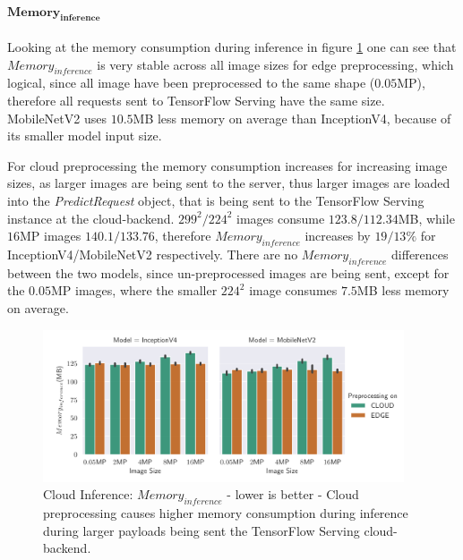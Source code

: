 \paragraph{$\mathbf{Memory_{inference}}$}
Looking at the memory consumption during inference in figure \ref{fig:cloudInferenceInferenceMemory} one can see that $Memory_{inference}$ is very stable across all image sizes for edge preprocessing, which logical, since all image have been preprocessed to the same shape ($0.05$MP), therefore all requests sent to TensorFlow Serving have the same size.
MobileNetV2 uses $10.5$MB less memory on average than InceptionV4, because of its smaller model input size.

For cloud preprocessing the memory consumption increases for increasing image sizes, as larger images are being sent to the server, thus larger images are loaded into the \emph{PredictRequest} object, that is being sent to the  TensorFlow Serving instance at the cloud-backend.
$299^2/224^2$ images consume $123.8/112.34$MB, while $16$MP images $140.1/133.76$, therefore $Memory_{inference}$ increases by $19/13\%$ for InceptionV4/MobileNetV2 respectively.
There are no $Memory_{inference}$  differences between the two models, since un-preprocessed images are being sent, except for the $0.05$MP images, where the smaller $224^2$ image consumes $7.5$MB less memory on average.
\begin{figure}[!htb]
\centering
\includegraphics[width=0.95\textwidth]{./Bilder/single_plots/cloud_inference_plots/Cloud_Inference_Memory.pdf}
\caption[Cloud Inference:  $Memory_{inference}$ - lower is better]{Cloud Inference:  $Memory_{inference}$ - lower is better - Cloud preprocessing causes higher memory consumption during inference during larger payloads being sent the TensorFlow Serving cloud-backend.}
\label{fig:cloudInferenceInferenceMemory}
\end{figure}
